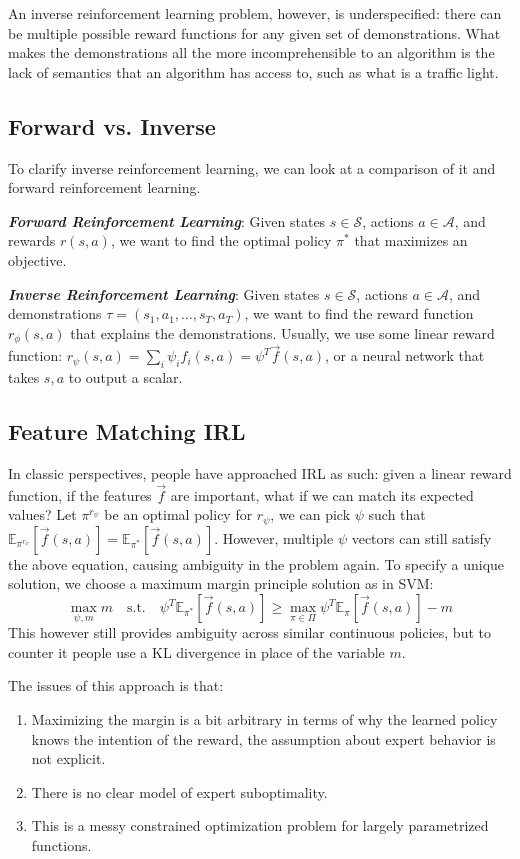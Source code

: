 An inverse reinforcement learning problem, however, is underspecified: there can be multiple possible reward functions for any given set of demonstrations.
What makes the demonstrations all the more incomprehensible to an algorithm is the lack of semantics that an algorithm has access to, such as what is a traffic light.

\subsection{Forward vs. Inverse}
To clarify inverse reinforcement learning, we can look at a comparison of it and forward reinforcement learning.

\textbf{\textit{Forward Reinforcement Learning}}: Given states $s \in \mathcal{S}$, actions $a \in \mathcal{A}$, and rewards $r(s, a)$, we want to find the optimal policy $\pi^*$ that maximizes an objective.

\textbf{\textit{Inverse Reinforcement Learning}}: Given states $s \in \mathcal{S}$, actions $a \in \mathcal{A}$, and demonstrations $\tau = (s_1, a_1, \dots, s_T, a_T)$, we want to find the reward function $r_\phi(s, a)$ that explains the demonstrations.
Usually, we use some linear reward function: $r_\psi (s, a) = \sum_i \psi_i f_i(s, a) = \psi^T \vec{f}(s, a)$, or a neural network that takes $s, a$ to output a scalar.

\subsection{Feature Matching IRL}
In classic perspectives, people have approached IRL as such: given a linear reward function, if the features $\vec{f}$ are important, what if we can match its expected values?
Let $\pi^{r_\psi}$ be an optimal policy for $r_\psi$, we can pick $\psi$ such that $\mathbb{E}_{\pi^{r_\psi}}[\vec{f}(s, a)] = \mathbb{E}_{\pi^*}[\vec{f}(s, a)]$.
However, multiple $\psi$ vectors can still satisfy the above equation, causing ambiguity in the problem again.
To specify a unique solution, we choose a maximum margin principle solution as in SVM:
\[
    \max_{\psi, m} m \quad \text{s.t.} \quad \psi^T \mathbb{E}_{\pi^*}[\vec{f}(s, a)] \geq \max_{\pi \in \Pi} \psi^T \mathbb{E}_{\pi}[\vec{f}(s, a)] - m
\]
This however still provides ambiguity across similar continuous policies, but to counter it people use a KL divergence in place of the variable $m$.

The issues of this approach is that:
\begin{enumerate}
    \item Maximizing the margin is a bit arbitrary in terms of why the learned policy knows the intention of the reward, the assumption about expert behavior is not explicit.
    \item There is no clear model of expert suboptimality.
    \item This is a messy constrained optimization problem for largely parametrized functions.
\end{enumerate}

